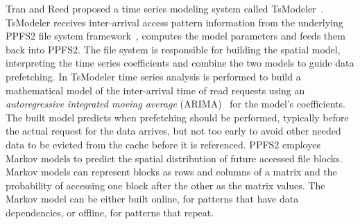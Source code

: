 Tran and Reed proposed a time series modeling system called TsModeler~\cite{TranR04}. TsModeler receives inter-arrival access pattern information from the underlying PPFS2 file system framework~\cite{Simitci1999}, computes the model 
parameters and feeds them back into PPFS2. The file system is responsible for building the spatial model, interpreting the time series coefficients and combine the two models to guide data prefetching. In TsModeler time series 
analysis is performed to build a mathematical model of the inter-arrival time of read requests using an \textit{autoregressive integrated moving average} (ARIMA)~\cite{Newbold1983} for the model's coefficients. The built model predicts
when prefetching should be performed, typically before the actual request for the data arrives, but not too early to avoid other needed data to be evicted from the cache before it is referenced. PPFS2 employes Markov models to 
predict the spatial distribution of future accessed file blocks. Markov models can represent blocks as rows and columns of a matrix and the probability of accessing one block after the other as the matrix values. The Markov model 
can be either built online, for patterns that have data dependencies, or offline, for patterns that repeat.

